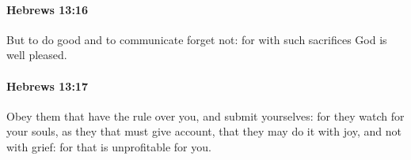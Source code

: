 		\paragraph{Hebrews 13:16} %
			\label{HEBREWS-13-16}

			But to do good and to communicate forget not: for with such sacrifices God is well pleased.

			\begin{framed}
			\scriptsize
				\begin{compactdesc}
					\item[SBLG] 
				\end{compactdesc}
			\end{framed}

		\paragraph{Hebrews 13:17} %
			\label{HEBREWS-13-17}

			Obey them that have the rule over you, and submit yourselves: for they watch for your souls, as they that must give account, that they may do it with joy, and not with grief: for that is unprofitable for you.

